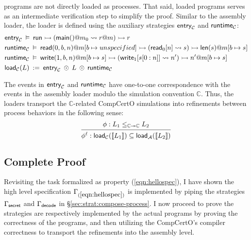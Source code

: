 programs
are not directly loaded as processes.
That said,
loaded  programs
serves as an intermediate
verification step
to simplify the proof.
Similar to the assembly loader,
the  loader is defined
using the auxiliary strategies
$ \mathsf{entry} _\mathcal{C}$ and
$ \mathsf{runtime} _\mathcal{C}$:
{\small
  \begin{align*}
    &  \mathsf{entry} _\mathcal{C} \:\vDash\:
     \mathsf{run}  \rightarrowtail
    ( \mathsf{main} ()@m_0 \leadsto r@m) \rightarrowtail r \\
    &  \mathsf{runtime} _\mathcal{C} \:\vDash\:
     \mathsf{read} (0, b, n)@m[b \mapsto unspecified]
    \rightarrowtail ( \mathsf{read} _0[n] \leadsto s)
    \rightarrowtail  \mathsf{len} (s)@m[b \mapsto s] \\
    &  \mathsf{runtime} _\mathcal{C} \:\vDash\:
     \mathsf{write} (1, b, n)@m[b \mapsto s]
    \rightarrowtail
    ( \mathsf{write} _1[s[0:n]] \leadsto n')
    \rightarrowtail n'@m[b \mapsto s]\\
    &  \mathsf{load} _\mathcal{C}(L)
    \::=\:  \mathsf{entry} _\mathcal{C} \: \odot \: L
    \: \odot \:  \mathsf{runtime} _\mathcal{C}
\end{align*}}%

\begin{theorem}
  \label{thm:strat:loader-simulation}
  The events in
  $ \mathsf{entry} _\mathcal{C}$ and $ \mathsf{runtime} _\mathcal{C}$
  have one-to-one correspondence
  with the events in the assembly loader
  modulo
  the simulation convention $\mathbb{C}$.
  Thus, the loaders
  transport
  the $\mathbb{C}$-related CompCertO simulations
  into
  refinements between process behaviors
  in the following sense:
  \[
    \begin{prooftree}
      \hypo{\phi: L_1 \le_{\mathbb{C} \twoheadrightarrow \mathbb{C}} L_2}
      \infer1{\phi^\ell: \kw{load}_\mathcal{C}(\llbracket L_1 \rrbracket) \subseteq
      \kw{load}_\mathcal{A}(\llbracket L_2 \rrbracket)}
    \end{prooftree}
  \]
\end{theorem}

\subsection{Complete Proof}
\label{sec:strat:complete-proof}
Revisiting
the task formalized as property (\ref{eqn:hellospec}),
I have shown
the high level specification
$\Gamma_{(\ref{eqn:hellospec})}$
is implemented by
piping the strategies
$\Gamma_{ \mathsf{secret} }$ and $\Gamma_{ \mathsf{decode} }$
in \S\ref{sec:strat:compose-process}.
I now proceed to
prove the strategies
are respectively implemented
by the actual programs
by proving
the correctness of the  programs,
and then utilizing the CompCertO's compiler correctness
to transport the refinements
into the assembly level.

